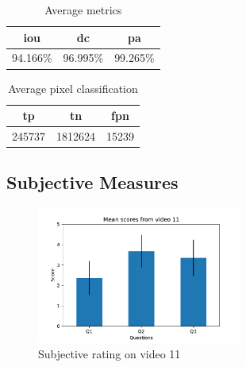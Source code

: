 \begin{minipage}[c]{0.475\textwidth}
\begin{table}[H]
    \centering
    \begin{tabular}{||c c c||} 
        \hline
        \acrshort{iou} & \acrshort{dc} & \acrshort{pa} \\ [0.5ex] 
        \hline\hline
        94.166\% & 96.995\% & 99.265\% \\ [1ex] 
        \hline
    \end{tabular}
    \caption{Average metrics}
    \label{tab:metrics_video_11}
\end{table}
\end{minipage}
\begin{minipage}[c]{0.475\textwidth}
\begin{table}[H]
    \centering
    \begin{tabular}{||c c c||} 
        \hline
        \acrshort{tp} & \acrshort{tn} & \acrshort{fpn} \\ [0.5ex] 
        \hline\hline
        245737 & 1812624 & 15239 \\ [1ex] 
        \hline
    \end{tabular}
    \caption{Average pixel classification}
    \label{tab:pixels_video_11}
\end{table}
\end{minipage}

\subsection{Subjective Measures}

\begin{figure}[H]
    \centering
    \includegraphics[width=0.6\textwidth]{img/subjective_measures/analysis/video_11.pdf}
    \caption{Subjective rating on video 11}
    \label{fig:visual_subj_vid11}
\end{figure}

